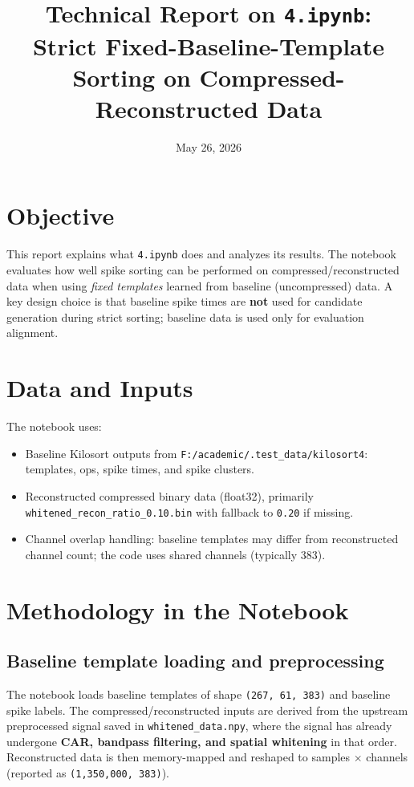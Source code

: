 ﻿\documentclass[11pt]{article}
\title{Technical Report on \texttt{4.ipynb}:\\Strict Fixed-Baseline-Template Sorting on Compressed-Reconstructed Data}
\author{}
\date{May 26, 2026}
\begin{document}
\maketitle

\section{Objective}
This report explains what \texttt{4.ipynb} does and analyzes its results. The notebook evaluates how well spike sorting can be performed on compressed/reconstructed data when using \emph{fixed templates} learned from baseline (uncompressed) data. A key design choice is that baseline spike times are \textbf{not} used for candidate generation during strict sorting; baseline data is used only for evaluation alignment.

\section{Data and Inputs}
The notebook uses:
\begin{itemize}
  \item Baseline Kilosort outputs from \texttt{F:/academic/.test\_data/kilosort4}: templates, ops, spike times, and spike clusters.
  \item Reconstructed compressed binary data (float32), primarily \texttt{whitened\_recon\_ratio\_0.10.bin} with fallback to \texttt{0.20} if missing.
  \item Channel overlap handling: baseline templates may differ from reconstructed channel count; the code uses shared channels (typically 383).
\end{itemize}

\section{Methodology in the Notebook}
\subsection{Baseline template loading and preprocessing}
The notebook loads baseline templates of shape \texttt{(267, 61, 383)} and baseline spike labels. The compressed/reconstructed inputs are derived from the upstream preprocessed signal saved in \texttt{whitened\_data.npy}, where the signal has already undergone \textbf{CAR, bandpass filtering, and spatial whitening} in that order. Reconstructed data is then memory-mapped and reshaped to samples $\times$ channels (reported as \texttt{(1,350,000, 383)}).
\end{document}
